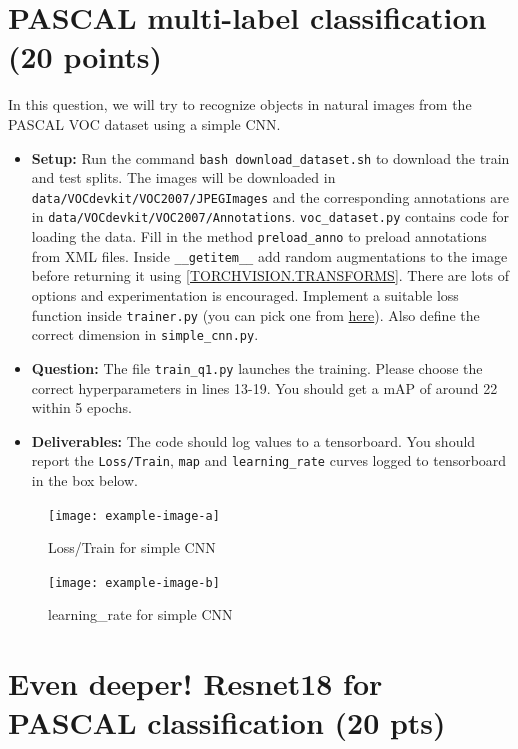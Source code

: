 \documentclass[11pt,addpoints,answers]{exam}
\numberwithin{equation}{section} %
\numberwithin{figure}{section} %
\numberwithin{table}{section} %
\begin{document}
\section{PASCAL multi-label classification (20 points)}
In this question, we will try to recognize objects in natural images from the PASCAL VOC dataset using a simple CNN.
\begin{itemize}
    \item \textbf{Setup:}  Run the command \texttt{bash download\_dataset.sh} to download the train and test splits. The images will be downloaded in 
\texttt{data/VOCdevkit/VOC2007/JPEGImages} and the corresponding annotations are in \texttt{data/VOCdevkit/VOC2007/Annotations}. \texttt{voc\_dataset.py} contains code for loading the data. Fill in the method \texttt{preload\_anno} to preload annotations from XML files. Inside \texttt{\_\_getitem\_\_} add random augmentations to the image before returning it using \href{https://pytorch.org/vision/stable/transforms.html}{[TORCHVISION.TRANSFORMS]}. There are lots of options and experimentation is encouraged. Implement a suitable loss function inside \texttt{trainer.py} (you can pick one from \href{https://pytorch.org/docs/stable/nn.html#loss-functions}{here}). Also define the correct dimension in \texttt{simple\_cnn.py}. 
\item \textbf{Question:} The file \texttt{train\_q1.py} launches the training. Please choose the correct hyperparameters in lines 13-19. You should get a mAP of around 22 within 5 epochs.
\item \textbf{Deliverables:} The code should log values to a tensorboard. You should report the \texttt{Loss/Train}, \texttt{map} and \texttt{learning\_rate} curves logged to tensorboard in the box below.
\end{itemize}

\begin{figure}[H]
    \centering
    \texttt{[image: example-image-a]}
    \caption{Loss/Train for simple CNN}
    \label{fig:q1_loss}
\end{figure}

\begin{figure}[H]
    \centering
    \texttt{[image: example-image-b]}
    \caption{learning\_rate for simple CNN}
    \label{fig:q1_loss}
\end{figure}

\clearpage

\section{Even deeper! Resnet18 for PASCAL classification (20 pts)}
\end{document}
